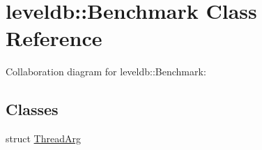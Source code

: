 \hypertarget{classleveldb_1_1_benchmark}{\section{leveldb\-:\-:Benchmark Class Reference}
\label{classleveldb_1_1_benchmark}
}


Collaboration diagram for leveldb\-:\-:Benchmark\-:
\subsection*{Classes}
\begin{DoxyCompactItemize}
\item 
struct \hyperlink{structleveldb_1_1_benchmark_1_1_thread_arg}{Thread\-Arg}
\end{DoxyCompactItemize}
